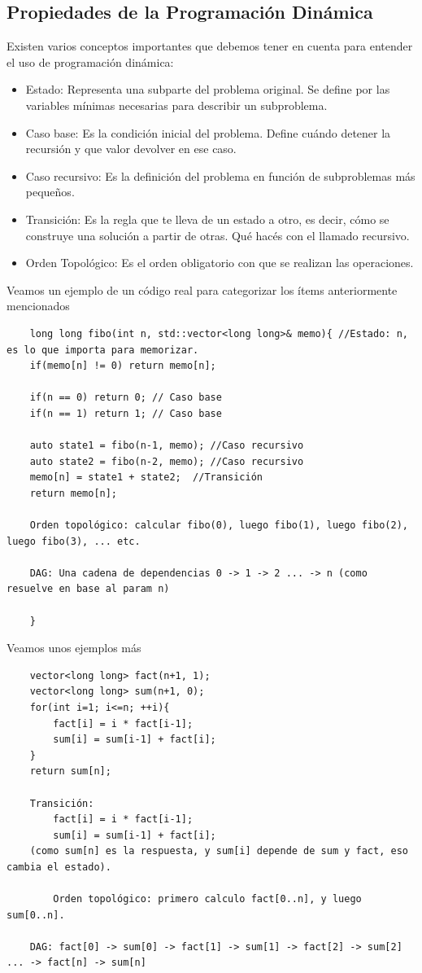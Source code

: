 \documentclass[10pt,a4paper]{article}
\begin{document}
\subsection*{Propiedades de la Programación Dinámica}
Existen varios conceptos importantes que debemos tener en cuenta para entender el uso de programación dinámica:
\begin{itemize}
    \item Estado: Representa una subparte del problema original. Se define por las variables mínimas necesarias para describir un subproblema.
    \item Caso base: Es la condición inicial del problema. Define cuándo detener la recursión y que valor devolver en ese caso.
    \item Caso recursivo: Es la definición del problema en función de subproblemas más pequeños. 
    \item Transición: Es la regla que te lleva de un estado a otro, es decir, cómo se construye una solución a partir de otras. Qué hacés con el llamado recursivo.
    \item Orden Topológico: Es el orden obligatorio con que se realizan las operaciones.

\end{itemize}
Veamos un ejemplo de un código real para categorizar los ítems anteriormente mencionados
\begin{lstlisting}
    long long fibo(int n, std::vector<long long>& memo){ //Estado: n, es lo que importa para memorizar.
    if(memo[n] != 0) return memo[n];
    
    if(n == 0) return 0; // Caso base 
    if(n == 1) return 1; // Caso base

    auto state1 = fibo(n-1, memo); //Caso recursivo
    auto state2 = fibo(n-2, memo); //Caso recursivo
    memo[n] = state1 + state2;  //Transición
    return memo[n];

    Orden topológico: calcular fibo(0), luego fibo(1), luego fibo(2), luego fibo(3), ... etc.
    
    DAG: Una cadena de dependencias 0 -> 1 -> 2 ... -> n (como resuelve en base al param n)

    }
\end{lstlisting} 
Veamos unos ejemplos más
\begin{lstlisting}
    vector<long long> fact(n+1, 1);
    vector<long long> sum(n+1, 0);
    for(int i=1; i<=n; ++i){
        fact[i] = i * fact[i-1];
        sum[i] = sum[i-1] + fact[i];
    }
    return sum[n];

    Transición:
        fact[i] = i * fact[i-1];
        sum[i] = sum[i-1] + fact[i];
    (como sum[n] es la respuesta, y sum[i] depende de sum y fact, eso cambia el estado).
    
        Orden topológico: primero calculo fact[0..n], y luego sum[0..n].
    
    DAG: fact[0] -> sum[0] -> fact[1] -> sum[1] -> fact[2] -> sum[2] ... -> fact[n] -> sum[n]
\end{lstlisting}
\begin{lstlisting}
    
\end{lstlisting}
\end{document}
